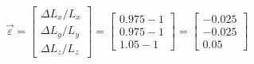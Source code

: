 \begin{enumerate}
\begin{equation*}
        \vec{\varepsilon} =
            \begin{bmatrix}
                \Delta L_x/L_x \\ \Delta L_y/L_y \\ \Delta L_z/L_z
            \end{bmatrix}
        =
            \begin{bmatrix}
                0.975-1 \\ 0.975-1 \\ 1.05-1
            \end{bmatrix}
        =
            \begin{bmatrix}
                -0.025 \\ -0.025 \\ 0.05
            \end{bmatrix}
    \end{equation*}
\end{enumerate}

